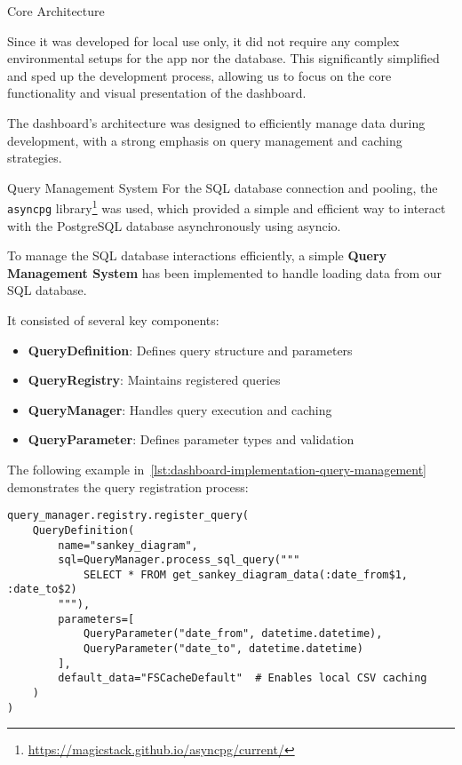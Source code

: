 \begin{section}{Core Architecture}
	\label{sec:implementation-core-architecture}

	Since it was developed for local use only, it did not require any complex environmental setups for the app nor the database.
	This significantly simplified and sped up the development process, allowing us to focus on the core functionality and visual presentation of the dashboard.

	The dashboard's architecture was designed to efficiently manage data during development, with a strong emphasis on query management and caching strategies.

	\begin{subsection}{Query Management System}
		\label{subsec:implementation-core-architecture-query-management}
		For the SQL database connection and pooling, the \texttt{asyncpg} library\footnote{\url{https://magicstack.github.io/asyncpg/current/}} was used,
		which provided a simple and efficient way to interact with the PostgreSQL database asynchronously using asyncio.

		To manage the SQL database interactions efficiently, a simple \textbf{Query Management System} has been implemented to handle loading data from our SQL database.

		It consisted of several key components:
		\begin{itemize}
			\item \textbf{QueryDefinition}: Defines query structure and parameters
			\item \textbf{QueryRegistry}: Maintains registered queries
			\item \textbf{QueryManager}: Handles query execution and caching
			\item \textbf{QueryParameter}: Defines parameter types and validation
		\end{itemize}

		The following example in~\autoref{lst:dashboard-implementation-query-management} demonstrates the query registration process:

		\begin{listing}[H]
			\caption{Query Management Example}
			\begin{verbatim}
query_manager.registry.register_query(
    QueryDefinition(
        name="sankey_diagram",
        sql=QueryManager.process_sql_query("""
            SELECT * FROM get_sankey_diagram_data(:date_from$1, :date_to$2)
        """),
        parameters=[
            QueryParameter("date_from", datetime.datetime),
            QueryParameter("date_to", datetime.datetime)
        ],
        default_data="FSCacheDefault"  # Enables local CSV caching
    )
)
			\end{verbatim}
			\label{lst:dashboard-implementation-query-management}
		\end{listing}


\end{subsection}
\end{section}
